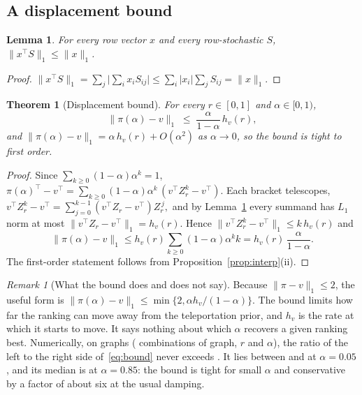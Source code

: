 \documentclass[11pt,a4paper]{article}
\newtheorem{theorem}{Theorem}
\newtheorem{lemma}{Lemma}
\theoremstyle{definition}
\theoremstyle{remark}
\newtheorem{remark}{Remark}
\begin{document}
\subsection{A displacement bound}

\begin{lemma}\label{lem:contract}
For every row vector $x$ and every row-stochastic $S$, $\|x^\top S\|_1\le\|x\|_1$.
\end{lemma}
\begin{proof}
$\|x^\top S\|_1=\sum_j\bigl|\sum_ix_iS_{ij}\bigr|\le\sum_i|x_i|\sum_jS_{ij}=\|x\|_1$.
\end{proof}

\begin{theorem}[Displacement bound]\label{thm:bound}
For every $r\in[0,1]$ and $\alpha\in[0,1)$,
\begin{equation}
\|\pi(\alpha)-v\|_1\;\le\;\frac{\alpha}{1-\alpha}\,h_v(r),
\label{eq:bound}
\end{equation}
and $\|\pi(\alpha)-v\|_1=\alpha\,h_v(r)+O(\alpha^2)$ as $\alpha\to0$, so the bound is tight to first order.
\end{theorem}
\begin{proof}
Since $\sum_{k\ge0}(1-\alpha)\alpha^k=1$,
\(
\pi(\alpha)^\top-v^\top=\sum_{k\ge0}(1-\alpha)\alpha^k\,(v^\top Z_r^k-v^\top).
\)
Each bracket telescopes,
\(
v^\top Z_r^k-v^\top=\sum_{j=0}^{k-1}(v^\top Z_r-v^\top)Z_r^{\,j},
\)
and by Lemma~\ref{lem:contract} every summand has $L_1$ norm at most $\|v^\top Z_r-v^\top\|_1=h_v(r)$.
Hence $\|v^\top Z_r^k-v^\top\|_1\le k\,h_v(r)$ and
\[
\|\pi(\alpha)-v\|_1\le h_v(r)\sum_{k\ge0}(1-\alpha)\alpha^k k=h_v(r)\,\frac{\alpha}{1-\alpha}.
\]
The first-order statement follows from Proposition~\ref{prop:interp}(ii).
\end{proof}

\begin{remark}[What the bound does and does not say]\label{rem:bound}
Because $\|\pi-v\|_1\le2$, the useful form is $\|\pi(\alpha)-v\|_1\le\min\{2,\alpha h_v/(1-\alpha)\}$.
The bound limits how far the ranking can move away from the teleportation prior, and $h_v$ is the
rate at which it starts to move. It says nothing about which $\alpha$ recovers a given ranking best.
Numerically, on \BoundGraphs{} graphs (\BoundCases{} combinations of graph, $r$ and $\alpha$), the ratio
of the left to the right side of~\eqref{eq:bound} never exceeds \BoundMax. It lies between \BoundLoMin{}
and \BoundLoMax{} at $\alpha=0.05$, and its median is \BoundMedEightyFive{} at $\alpha=0.85$: the bound
is tight for small $\alpha$ and conservative by a factor of about six at the usual damping.
\end{remark}
\end{document}
